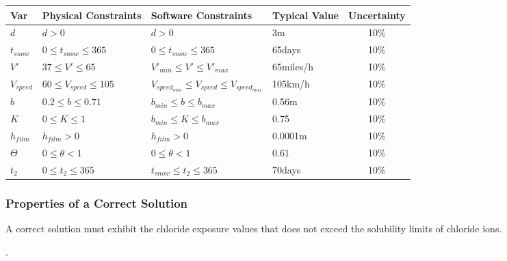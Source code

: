\documentclass[12pt]{article}
\begin{document}
\begin{table}[!h]
  \caption{Input Variables} \label{TblInputVar}
  \renewcommand{\arraystretch}{1.2}
\noindent \begin{longtable*}{l l l l c} 
  \toprule
  \textbf{Var} & \textbf{Physical Constraints} & \textbf{Software Constraints} &
                             \textbf{Typical Value} & \textbf{Uncertainty}\\
  \midrule 
  $d$ & $d > 0$ & $d>0$ & 3m & 10\%
  \\
  $t_{snow}$ & $0 \leq t_{snow} \leq 365$ & $0 \leq t_{snow} \leq 365$ & 65days & 10\%
  \\
  $V'$ & $37 \leq V' \leq 65$ & $V'_{min}\leq V' \leq V'_{max}$ & 65miles/h & 10\%
  \\
  $V_{speed}$ & $60 \leq V_{speed} \leq 105$ & $V_{speed_{min}} \leq V_{speed} \leq V_{speed_{max}}$ & 105km/h & 10\%
  \\
  $b$ & $0.2 \leq b \leq 0.71$ & $b_{min} \leq b \leq b_{max}$ & 0.56m & 10\%
  \\
  $K$ & $0 \leq K \leq 1$ & $b_{min} \leq K \leq b_{max}$ & 0.75 & 10\%
  \\
  $h_{film}$ & $h_{film} > 0$ & $h_{film} > 0$ & 0.0001m & 10\%
  \\
  $\Theta$ & $0 \leq \theta < 1$ & $0 \leq \theta < 1$ & 0.61 & 10\%
  \\
  $t_2$ & $0 \leq t_2 \leq 365$ & $t_{snow} \leq t_2 \leq 365$ & 70days & 10\%
  \\
  \bottomrule
\end{longtable*}
\end{table}

\noindent 
\subsubsection{Properties of a Correct Solution} \label{sec_CorrectSolution}

\noindent
A correct solution must exhibit the chloride exposure values that does not exceed the solubility limits of chloride ions. 


.  
\end{document}

